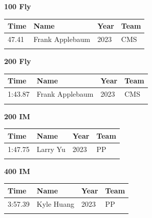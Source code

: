 \vspace{1.2em}
\noindent\begin{minipage}[t]{0.98\textwidth}
\centering
\textbf{\textcolor{teamprimary}{100 Fly}}\par
\vspace{0.5em}
\centering
\small
\renewcommand{\arraystretch}{1.0}
\setlength{\tabcolsep}{4pt}
\begin{tabular}{@{}p{2.5cm}p{4.5cm}p{1.5cm}p{2.5cm}@{}}
\toprule
\textbf{Time} & \textbf{Name} & \textbf{Year} & \textbf{Team} \\
\midrule
47.41 & Frank Applebaum & 2023 & CMS \\
\bottomrule
\vspace{0.5em}
\end{tabular}
\end{minipage}
\vspace{1.2em}
\noindent\begin{minipage}[t]{0.98\textwidth}
\centering
\textbf{\textcolor{teamprimary}{200 Fly}}\par
\vspace{0.5em}
\centering
\small
\renewcommand{\arraystretch}{1.0}
\setlength{\tabcolsep}{4pt}
\begin{tabular}{@{}p{2.5cm}p{4.5cm}p{1.5cm}p{2.5cm}@{}}
\toprule
\textbf{Time} & \textbf{Name} & \textbf{Year} & \textbf{Team} \\
\midrule
1:43.87 & Frank Applebaum & 2023 & CMS \\
\bottomrule
\vspace{0.5em}
\end{tabular}
\end{minipage}
\vspace{1.2em}
\noindent\begin{minipage}[t]{0.98\textwidth}
\centering
\textbf{\textcolor{teamprimary}{200 IM}}\par
\vspace{0.5em}
\centering
\small
\renewcommand{\arraystretch}{1.0}
\setlength{\tabcolsep}{4pt}
\begin{tabular}{@{}p{2.5cm}p{4.5cm}p{1.5cm}p{2.5cm}@{}}
\toprule
\textbf{Time} & \textbf{Name} & \textbf{Year} & \textbf{Team} \\
\midrule
1:47.75 & Larry Yu & 2023 & PP \\
\bottomrule
\vspace{0.5em}
\end{tabular}
\end{minipage}
\vspace{1.2em}
\noindent\begin{minipage}[t]{0.98\textwidth}
\centering
\textbf{\textcolor{teamprimary}{400 IM}}\par
\vspace{0.5em}
\centering
\small
\renewcommand{\arraystretch}{1.0}
\setlength{\tabcolsep}{4pt}
\begin{tabular}{@{}p{2.5cm}p{4.5cm}p{1.5cm}p{2.5cm}@{}}
\toprule
\textbf{Time} & \textbf{Name} & \textbf{Year} & \textbf{Team} \\
\midrule
3:57.39 & Kyle Huang & 2023 & PP \\
\bottomrule
\vspace{0.5em}
\end{tabular}
\end{minipage}
